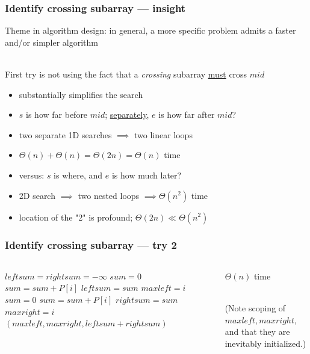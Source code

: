 \documentclass[10pt,aspectratio=169]{beamer}
\newcommand{\stanza}{ \\~\ }
\begin{document}
\begin{frame} \frametitle{Identify crossing subarray --- insight}
Theme in algorithm design: in general, a more specific problem admits a
  faster and/or simpler algorithm \stanza

First try is not using the fact that a \emph{crossing} subarray
\underline{must} cross $mid$
\begin{itemize}
  \item substantially simplifies the search
  \item $s$ is how far before $mid$; \underline{separately}, $e$ is how far after $mid$?
  \item two separate 1D searches $\implies$ two linear loops
  \item $\Theta(n)+\Theta(n) = \Theta(2n) = \Theta(n)$ time
  \item versus: $s$ is where, and $e$ is how much later?
  \item 2D search $\implies$ two nested loops $\implies \Theta(n^2)$ time
  \item location of the "2" is profound; $\Theta(2n) \ll \Theta(n^2)$
\end{itemize}
\end{frame}

\begin{frame} \frametitle{Identify crossing subarray --- try 2}
\begin{columns}
\begin{column}{0.6\textwidth}
  {\tiny
  \begin{algorithmic}[1]
    \State $leftsum = rightsum = -\infty$
    \State $sum = 0$
      \State $sum = sum + P[i]$
        \State $leftsum = sum$
        \State $maxleft = i$
      \EndIf
    \EndFor
    \State $sum = 0$
      \State $sum = sum + P[i]$
        \State $rightsum = sum$
        \State $maxright = i$
      \EndIf
    \EndFor
    \State \Return $(maxleft, maxright, leftsum + rightsum)$
    \EndFunction
  \end{algorithmic}
  }
\end{column}
\begin{column}{0.4\textwidth}
  $\Theta(n)$ time \stanza

  (Note scoping of $maxleft, maxright$, and that they are inevitably initialized.)
\end{column}
\end{columns}
\end{frame}
\end{document}
